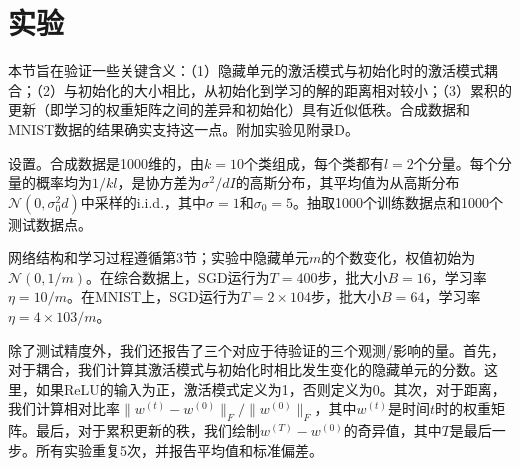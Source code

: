 \section{实验}
本节旨在验证一些关键含义：（1）隐藏单元的激活模式与初始化时的激活模式耦合；（2）与初始化的大小相比，从初始化到学习的解的距离相对较小；（3）累积的更新（即学习的权重矩阵之间的差异和初始化）具有近似低秩。合成数据和MNIST数据的结果确实支持这一点。附加实验见附录D。
\par
设置。合成数据是1000维的，由$k=10$个类组成，每个类都有$l=2$个分量。每个分量的概率均为$1/kl$，是协方差为$\sigma^2 / dI$的高斯分布，其平均值为从高斯分布$\mathcal{N}(0,\sigma^2_0 d)$中采样的i.i.d.，其中$\sigma = 1$和$\sigma_0 = 5$。抽取1000个训练数据点和1000个测试数据点。
\par
网络结构和学习过程遵循第3节；实验中隐藏单元$m$的个数变化，权值初始为$\mathcal{N}(0,1/m)$。在综合数据上，SGD运行为$T=400$步，批大小$B=16$，学习率$\eta = 10/m$。在MNIST上，SGD运行为$T=2×104$步，批大小$B=64$，学习率$\eta=4×103/m$。
\par
除了测试精度外，我们还报告了三个对应于待验证的三个观测/影响的量。首先，对于耦合，我们计算其激活模式与初始化时相比发生变化的隐藏单元的分数。这里，如果ReLU的输入为正，激活模式定义为1，否则定义为0。其次，对于距离，我们计算相对比率$\|w^{(t)} - w^{(0)}\|_F/\|w^{(0)}\|_F$，其中$w^{(t)}$是时间$t$时的权重矩阵。最后，对于累积更新的秩，我们绘制$w^{(T)}-w^{(0)}$的奇异值，其中$T$是最后一步。所有实验重复5次，并报告平均值和标准偏差。

